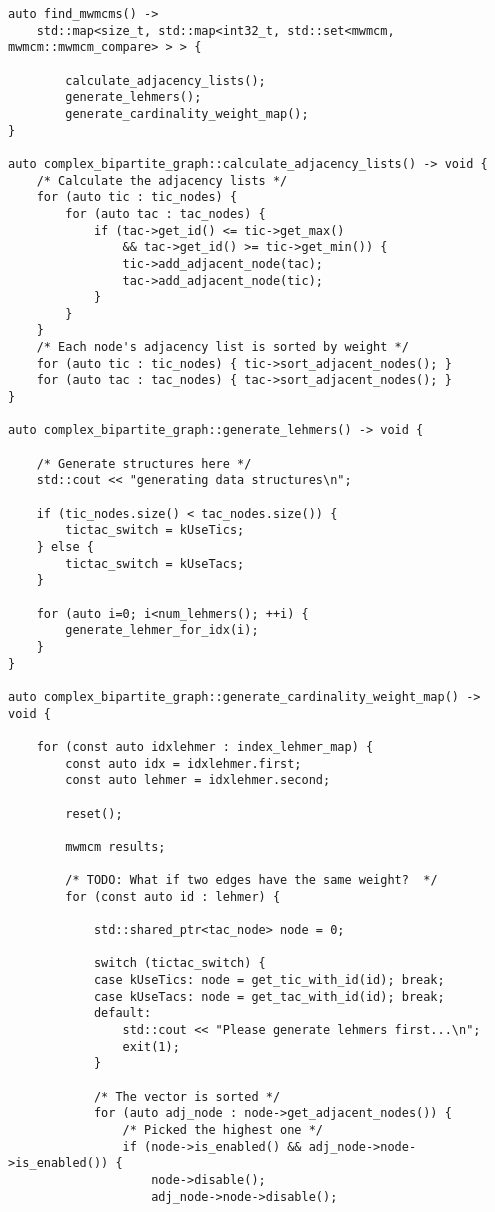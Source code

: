 \documentclass{article}
\begin{document}
{
  \footnotesize
\begin{verbatim}
auto find_mwmcms() ->
    std::map<size_t, std::map<int32_t, std::set<mwmcm, mwmcm::mwmcm_compare> > > {

        calculate_adjacency_lists();
        generate_lehmers();
        generate_cardinality_weight_map();
}

auto complex_bipartite_graph::calculate_adjacency_lists() -> void {
    /* Calculate the adjacency lists */
    for (auto tic : tic_nodes) {
        for (auto tac : tac_nodes) {
            if (tac->get_id() <= tic->get_max()
                && tac->get_id() >= tic->get_min()) {
                tic->add_adjacent_node(tac);
                tac->add_adjacent_node(tic);
            }
        }
    }
    /* Each node's adjacency list is sorted by weight */
    for (auto tic : tic_nodes) { tic->sort_adjacent_nodes(); }
    for (auto tac : tac_nodes) { tac->sort_adjacent_nodes(); }
}

auto complex_bipartite_graph::generate_lehmers() -> void {

    /* Generate structures here */
    std::cout << "generating data structures\n";

    if (tic_nodes.size() < tac_nodes.size()) {
        tictac_switch = kUseTics;
    } else {
        tictac_switch = kUseTacs;
    }

    for (auto i=0; i<num_lehmers(); ++i) {
        generate_lehmer_for_idx(i);
    }
}

auto complex_bipartite_graph::generate_cardinality_weight_map() -> void {

    for (const auto idxlehmer : index_lehmer_map) {
        const auto idx = idxlehmer.first;
        const auto lehmer = idxlehmer.second;

        reset();

        mwmcm results;

        /* TODO: What if two edges have the same weight?  */
        for (const auto id : lehmer) {

            std::shared_ptr<tac_node> node = 0;

            switch (tictac_switch) {
            case kUseTics: node = get_tic_with_id(id); break;
            case kUseTacs: node = get_tac_with_id(id); break;
            default:
                std::cout << "Please generate lehmers first...\n";
                exit(1);
            }

            /* The vector is sorted */
            for (auto adj_node : node->get_adjacent_nodes()) {
                /* Picked the highest one */
                if (node->is_enabled() && adj_node->node->is_enabled()) {
                    node->disable();
                    adj_node->node->disable();


\end{verbatim}}
\end{document}
